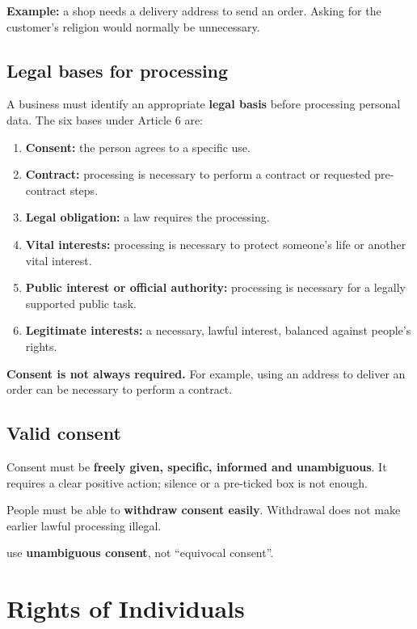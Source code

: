 \documentclass[12pt,a4paper]{report}
\newcommand{\tightlist}{}
\begin{document}
\textbf{Example:} a shop needs a delivery address to send an order. Asking for the customer's religion would normally be unnecessary.

\hypertarget{legal-bases-for-processing}{%
\subsection{Legal bases for processing}\label{legal-bases-for-processing}}

A business must identify an appropriate \textbf{legal basis} before processing personal data. The six bases under Article 6 are:

\begin{enumerate}
\def\labelenumi{\arabic{enumi}.}
\tightlist
\item
  \textbf{Consent:} the person agrees to a specific use.
\item
  \textbf{Contract:} processing is necessary to perform a contract or requested pre-contract steps.
\item
  \textbf{Legal obligation:} a law requires the processing.
\item
  \textbf{Vital interests:} processing is necessary to protect someone's life or another vital interest.
\item
  \textbf{Public interest or official authority:} processing is necessary for a legally supported public task.
\item
  \textbf{Legitimate interests:} a necessary, lawful interest, balanced against people's rights.
\end{enumerate}

\textbf{Consent is not always required.} For example, using an address to deliver an order can be necessary to perform a contract.

\hypertarget{valid-consent}{%
\subsection{Valid consent}\label{valid-consent}}

Consent must be \textbf{freely given, specific, informed and unambiguous}. It requires a clear positive action; silence or a pre-ticked box is not enough.

People must be able to \textbf{withdraw consent easily}. Withdrawal does not make earlier lawful processing illegal.

use \textbf{unambiguous consent}, not ``equivocal consent''.

\hypertarget{rights-of-individuals}{%
\section{Rights of Individuals}\label{rights-of-individuals}}
\end{document}
